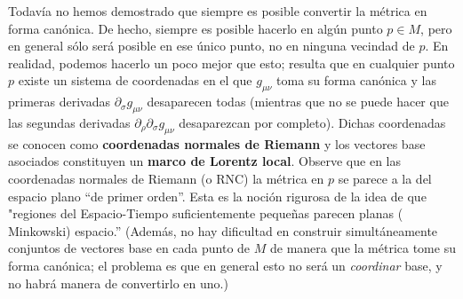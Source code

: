 \documentclass[11pt,b5paper,openany,twoside]{book}
\newcommand{\mn}{{\mu\nu}}
\newcommand{\p}[1]{{\partial_{#1}}}
\begin{document}
Todavía no hemos demostrado que siempre es posible convertir la métrica en forma canónica.
De hecho, siempre es posible hacerlo en algún punto $p\in M$, pero en general sólo será posible en ese único punto, no en ninguna vecindad de $p$.
En realidad, podemos hacerlo un poco mejor que esto; resulta que en cualquier punto $p$ existe un sistema de coordenadas en el que $g_\mn$ toma su forma canónica y las primeras derivadas $\p\sigma g_\mn$ desaparecen todas (mientras que no se puede hacer que las segundas derivadas $\p\rho \p\sigma g_\mn$ desaparezcan por completo).
Dichas coordenadas se conocen como {\bf coordenadas normales de Riemann} y los vectores base asociados constituyen un {\bf marco de Lorentz local}.
Observe que en las coordenadas normales de Riemann (o RNC) la métrica en $p$ se parece a la del espacio plano ``de primer orden''. Esta es la noción rigurosa de la idea de que "regiones del Espacio-Tiempo suficientemente pequeñas parecen planas ( Minkowski) espacio.'' (Además, no hay dificultad en construir simultáneamente conjuntos de vectores base en cada punto de $M$ de manera que la métrica tome su forma canónica; el problema es que en general esto no será un {\it coordinar} base, y no habrá manera de convertirlo en uno.)
\end{document}
